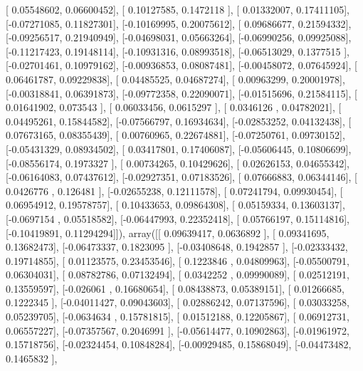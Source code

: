 \documentclass{article}
\begin{document}
       [ 0.05548602,  0.06600452],
       [ 0.10127585,  0.1472118 ],
       [ 0.01332007,  0.17411105],
       [-0.07271085,  0.11827301],
       [-0.10169995,  0.20075612],
       [ 0.09686677,  0.21594332],
       [-0.09256517,  0.21940949],
       [-0.04698031,  0.05663264],
       [-0.06990256,  0.09925088],
       [-0.11217423,  0.19148114],
       [-0.10931316,  0.08993518],
       [-0.06513029,  0.1377515 ],
       [-0.02701461,  0.10979162],
       [-0.00936853,  0.08087481],
       [-0.00458072,  0.07645924],
       [ 0.06461787,  0.09229838],
       [ 0.04485525,  0.04687274],
       [ 0.00963299,  0.20001978],
       [-0.00318841,  0.06391873],
       [-0.09772358,  0.22090071],
       [-0.01515696,  0.21584115],
       [ 0.01641902,  0.073543  ],
       [ 0.06033456,  0.0615297 ],
       [ 0.0346126 ,  0.04782021],
       [ 0.04495261,  0.15844582],
       [-0.07566797,  0.16934634],
       [-0.02853252,  0.04132438],
       [ 0.07673165,  0.08355439],
       [ 0.00760965,  0.22674881],
       [-0.07250761,  0.09730152],
       [-0.05431329,  0.08934502],
       [ 0.03417801,  0.17406087],
       [-0.05606445,  0.10806699],
       [-0.08556174,  0.1973327 ],
       [ 0.00734265,  0.10429626],
       [ 0.02626153,  0.04655342],
       [-0.06164083,  0.07437612],
       [-0.02927351,  0.07183526],
       [ 0.07666883,  0.06344146],
       [ 0.0426776 ,  0.126481  ],
       [-0.02655238,  0.12111578],
       [ 0.07241794,  0.09930454],
       [ 0.06954912,  0.19578757],
       [ 0.10433653,  0.09864308],
       [ 0.05159334,  0.13603137],
       [-0.0697154 ,  0.05518582],
       [-0.06447993,  0.22352418],
       [ 0.05766197,  0.15114816],
       [-0.10419891,  0.11294294]]), array([[ 0.09639417,  0.0636892 ],
       [ 0.09341695,  0.13682473],
       [-0.06473337,  0.1823095 ],
       [-0.03408648,  0.1942857 ],
       [-0.02333432,  0.19714855],
       [ 0.01123575,  0.23453546],
       [ 0.1223846 ,  0.04809963],
       [-0.05500791,  0.06304031],
       [ 0.08782786,  0.07132494],
       [ 0.0342252 ,  0.09990089],
       [ 0.02512191,  0.13559597],
       [-0.026061  ,  0.16680654],
       [ 0.08438873,  0.05389151],
       [ 0.01266685,  0.1222345 ],
       [-0.04011427,  0.09043603],
       [ 0.02886242,  0.07137596],
       [ 0.03033258,  0.05239705],
       [-0.0634634 ,  0.15781815],
       [ 0.01512188,  0.12205867],
       [ 0.06912731,  0.06557227],
       [-0.07357567,  0.2046991 ],
       [-0.05614477,  0.10902863],
       [-0.01961972,  0.15718756],
       [-0.02324454,  0.10848284],
       [-0.00929485,  0.15868049],
       [-0.04473482,  0.1465832 ],
\end{document}
